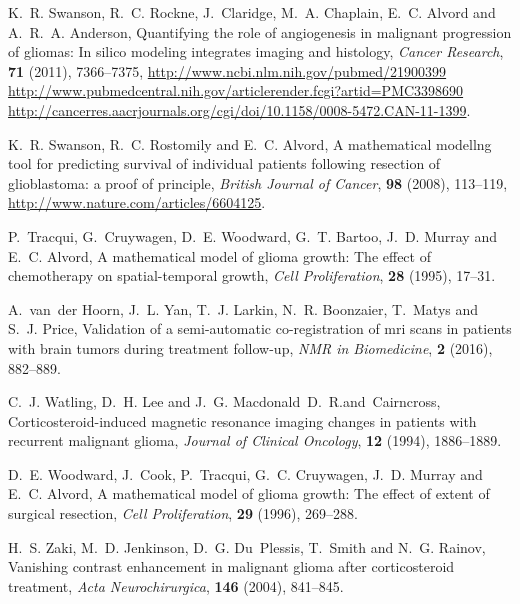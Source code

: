 \documentclass{aims}
\numberwithin{equation}{section}
\begin{document}
\begin{thebibliography}{10}
\newblock K.~R. Swanson, R.~C. Rockne, J.~Claridge, M.~A. Chaplain, E.~C.
  Alvord and A.~R.~A. Anderson,
\newblock Quantifying the role of angiogenesis in malignant progression of
  gliomas: In silico modeling integrates imaging and histology,
\newblock \emph{Cancer Research}, \textbf{71} (2011), 7366--7375,
\newblock \urlprefix\url{http://www.ncbi.nlm.nih.gov/pubmed/21900399
  http://www.pubmedcentral.nih.gov/articlerender.fcgi?artid=PMC3398690
  http://cancerres.aacrjournals.org/cgi/doi/10.1158/0008-5472.CAN-11-1399}.

\newblock K.~R. Swanson, R.~C. Rostomily and E.~C. Alvord,
\newblock A mathematical modellng tool for predicting survival of individual
  patients following resection of glioblastoma: a proof of principle,
\newblock \emph{British Journal of Cancer}, \textbf{98} (2008), 113--119,
\newblock \urlprefix\url{http://www.nature.com/articles/6604125}.

\newblock P.~Tracqui, G.~Cruywagen, D.~E. Woodward, G.~T. Bartoo, J.~D. Murray
  and E.~C. Alvord,
\newblock A mathematical model of glioma growth: The effect of chemotherapy on
  spatial-temporal growth,
\newblock \emph{Cell Proliferation}, \textbf{28} (1995), 17--31.

\newblock A.~van~der Hoorn, J.~L. Yan, T.~J. Larkin, N.~R. Boonzaier, T.~Matys
  and S.~J. Price,
\newblock Validation of a semi-automatic co-registration of mri scans in
  patients with brain tumors during treatment follow-up,
\newblock \emph{NMR in Biomedicine}, \textbf{2} (2016), 882--889.

\newblock C.~J. Watling, D.~H. Lee and J.~G. Macdonald~D.~R.and~Cairncross,
\newblock Corticosteroid-induced magnetic resonance imaging changes in patients
  with recurrent malignant glioma,
\newblock \emph{Journal of Clinical Oncology}, \textbf{12} (1994), 1886--1889.

\newblock D.~E. Woodward, J.~Cook, P.~Tracqui, G.~C. Cruywagen, J.~D. Murray
  and E.~C. Alvord,
\newblock A mathematical model of glioma growth: The effect of extent of
  surgical resection,
\newblock \emph{Cell Proliferation}, \textbf{29} (1996), 269--288.

\newblock H.~S. Zaki, M.~D. Jenkinson, D.~G. Du~Plessis, T.~Smith and N.~G.
  Rainov,
\newblock Vanishing contrast enhancement in malignant glioma after
  corticosteroid treatment,
\newblock \emph{Acta Neurochirurgica}, \textbf{146} (2004), 841--845.

\end{thebibliography}
\end{document}
